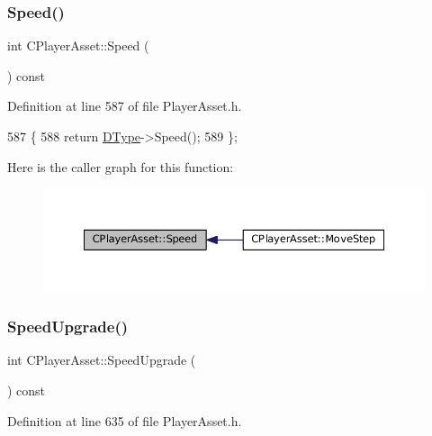 \subsubsection{\texorpdfstring{Speed()}{Speed()}}
{\footnotesize\ttfamily int C\+Player\+Asset\+::\+Speed (\begin{DoxyParamCaption}{ }\end{DoxyParamCaption}) const\hspace{0.3cm}{\ttfamily [inline]}}



Definition at line 587 of file Player\+Asset.\+h.


\begin{DoxyCode}
587                          \{
588             \textcolor{keywordflow}{return} \hyperlink{classCPlayerAsset_a5d61f73471e1e6f0a6ab15f2ffa7b359}{DType}->Speed(); 
589         \};
\end{DoxyCode}
Here is the caller graph for this function\+:
\nopagebreak
\begin{figure}[H]
\begin{center}
\leavevmode
\includegraphics[width=350pt]{classCPlayerAsset_af1c093600f1567e3abf1cefc0f5350d5_icgraph}
\end{center}
\end{figure}
\hypertarget{classCPlayerAsset_a6b6b17c9d4b1fe095120032bee4977af}{}\label{classCPlayerAsset_a6b6b17c9d4b1fe095120032bee4977af} 
\subsubsection{\texorpdfstring{Speed\+Upgrade()}{SpeedUpgrade()}}
{\footnotesize\ttfamily int C\+Player\+Asset\+::\+Speed\+Upgrade (\begin{DoxyParamCaption}{ }\end{DoxyParamCaption}) const\hspace{0.3cm}{\ttfamily [inline]}}



Definition at line 635 of file Player\+Asset.\+h.


